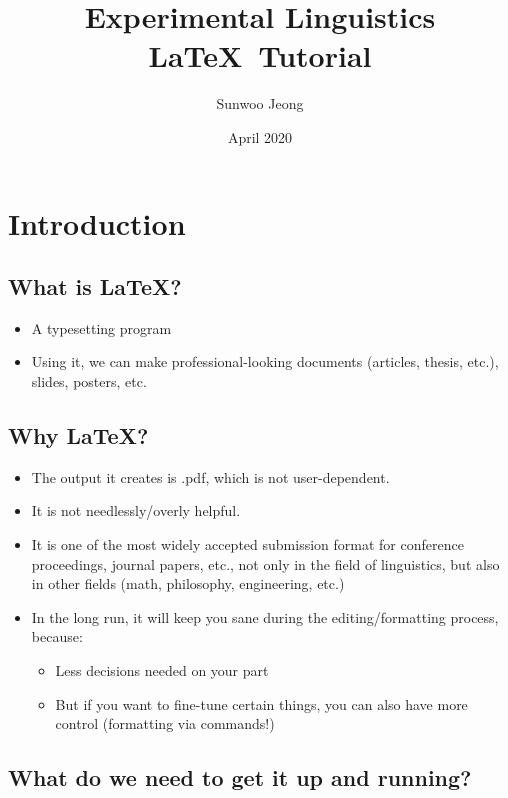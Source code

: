 \documentclass{article}
\title{Experimental Linguistics \\ \LaTeX\ Tutorial}
\author{Sunwoo Jeong}
\date{April 2020}
\begin{document}
\maketitle

\section{Introduction}

\subsection{What is \LaTeX?}
\begin{itemize}
    \item A typesetting program
    \item Using it, we can make professional-looking documents (articles, thesis, etc.), slides, posters, etc.
\end{itemize}

\subsection{Why \LaTeX?}

\begin{itemize}
    \item The output it creates is .pdf, which is not user-dependent.
    \item It is not needlessly/overly helpful.
    \item It is one of the most widely accepted submission format for conference proceedings, journal papers, etc., not only in the field of linguistics, but also in other fields (math, philosophy, engineering, etc.)
    \item In the long run, it will keep you sane during the editing/formatting process, because:
        \begin{itemize}
            \item Less decisions needed on your part
            \item But if you want to fine-tune certain things, you can also have more control (formatting via commands!)
        \end{itemize}
\end{itemize}

\subsection{What do we need to get it up and running?}
\end{document}
